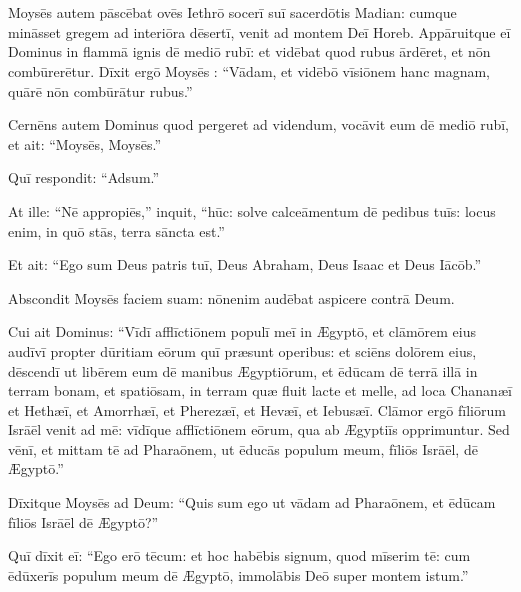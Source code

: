 \chapter{}


\vspace*{-0.75cm}
Moysēs autem pāscēbat ovēs Iethrō socerī suī sacerdōtis Madian:
cumque mināsset gregem ad interiōra dēsertī,
venit ad montem Deī Horeb.
Appāruitque eī Dominus in flammā ignis dē mediō rubī:
et vidēbat quod rubus ārdēret, et nōn combūrerētur.
Dīxit ergō Moysēs : ``Vādam, et vidēbō vīsiōnem hanc magnam, quārē nōn combūrātur rubus.''

Cernēns autem Dominus quod pergeret ad videndum,
vocāvit eum dē mediō rubī, et ait: ``Moysēs, Moysēs.''

Quī respondit: ``Adsum.''

At ille: ``Nē appropiēs,'' inquit, ``hūc: solve calceāmentum dē pedibus tuīs: locus enim,
in quō stās, terra sāncta est.'' 

Et ait: ``Ego sum Deus patris tuī, Deus Abraham, Deus Isaac et Deus Iācōb.''

Abscondit Moysēs faciem suam: nōn\linebreak enim audēbat aspicere contrā Deum.

Cui ait Dominus: ``Vīdī afflīctiōnem populī meī in Ægyptō,
et clāmōrem eius audīvī propter dūritiam eōrum quī præsunt operibus:
et sciēns dolōrem eius, dēscendī ut libērem eum dē manibus Ægyptiōrum,
et ēdūcam dē terrā illā in terram bonam, et spatiōsam,
in terram quæ fluit lacte et melle,
ad loca Chananæī et Hethæī, et Amorrhæī, et Pherezæī, et Hevæī, et Iebusæī.
Clāmor ergō fīliōrum Isrāēl venit ad mē: vīdīque afflīctiōnem eōrum,
qua ab Ægyptiīs opprimuntur.
Sed vēnī, et mittam tē ad Pharaōnem,
ut ēducās populum meum, fīliōs Isrāēl, dē Ægyptō.''

Dīxitque Moysēs ad Deum: ``Quis sum ego ut vādam ad Pharaōnem,
et ēdūcam fīliōs Isrāēl dē Ægyptō?''

Quī dīxit eī: ``Ego erō tēcum: et hoc habēbis signum,
quod mīserim tē: cum ēdūxerīs populum meum dē Ægyptō,
immolābis Deō super montem istum.''

